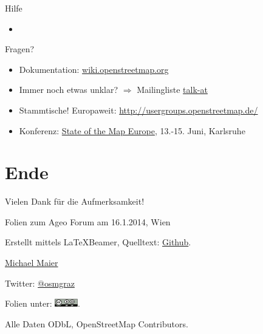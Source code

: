 \documentclass{beamer}
\begin{document}
\begin{frame}{Hilfe}
\begin{itemize}
  \item 
\end{itemize}

Fragen? 
\begin{itemize}
  \item Dokumentation: \href{http://wiki.openstreetmap.org}{wiki.openstreetmap.org}
  \item Immer noch etwas unklar? $\Rightarrow$ Mailingliste \href{http://lists.openstreetmap.org/listinfo/talk-at}{talk-at}
  \item Stammtische! Europaweit: \url{http://usergroups.openstreetmap.de/}
  \item Konferenz: \href{http://sotm-eu.org/}{State of the Map Europe}, 13.-15. Juni, Karlsruhe
\end{itemize}

  \pause
\end{frame}

\section{Ende}

\begin{frame}{Vielen Dank für die Aufmerksamkeit!}

  Folien zum Ageo Forum am 16.1.2014, Wien
\vspace{1cm}

Erstellt mittels \LaTeX Beamer, Quelltext: \href{https://github.com/species/vortrag-osm-ageo}{Github}.
\vspace{1cm}

\href{mailto:michael.maier@student.tugraz.at}{Michael Maier}

Twitter: \href{https://twitter.com/osmgraz}{@osmgraz}
\vspace{1cm}

Folien unter: \includegraphics[width=1cm]{cc-by-sa.pdf}. 

Alle Daten ODbL, OpenStreetMap Contributors.

\end{frame}
\end{document}
